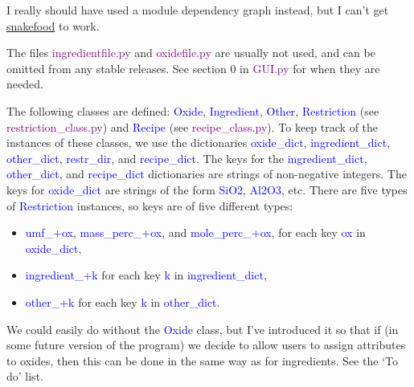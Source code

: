 \documentclass[a4paper,10pt]{article}
\def\'{\textquotesingle}
\def\blue{\textcolor{blue}}
\def\green{\textcolor{Purple}}
\begin{document}
I really should have used a module dependency graph instead, but I can't get \href{http://furius.ca/snakefood/}{snakefood} to work.

The files \green{ingredientfile.py} and \green{oxidefile.py} are usually not used, and can be omitted from any stable releases. See section 0 in \green{GUI.py} for when they are needed.

The following classes are defined: \blue{Oxide}, \blue{Ingredient}, \blue{Other}, \blue{Restriction} (see \green{restriction\_class.py}) and \blue{Recipe} (see \green{recipe\_class.py}). To keep track of the instances of these classes, we use the dictionaries \blue{oxide\_dict}, \blue{ingredient\_dict}, \blue{other\_dict}, \blue{restr\_dir}, and \blue{recipe\_dict}. The keys for the \blue{ingredient\_dict}, \blue{other\_dict}, and \blue{recipe\_dict} dictionaries are strings of non-negative integers. The keys for \blue{oxide\_dict} are strings of the form \blue{\'SiO2\'}, \blue{\'Al2O3\'}, etc.  There are five types of \blue{Restriction} instances, so keys are of five different types:
\begin{itemize}
\item \blue{\'umf\_\'+ox}, \blue{\'mass\_perc\_\'+ox}, and \blue{\'mole\_perc\_\'+ox}, for each key \blue{ox} in \blue{oxide\_dict},
\item \blue{\'ingredient\_\'+k} for each key \blue{k} in \blue{ingredient\_dict}, 
\item \blue{\'other\_\'+k} for each key \blue{k} in \blue{other\_dict}. 
\end{itemize}

We could easily do without the \blue{Oxide} class, but I've introduced it so that if (in some future version of the program) we decide to allow users to assign attributes to oxides, then this can be done in the same way as for ingredients. See the `To do' list.
\end{document}
